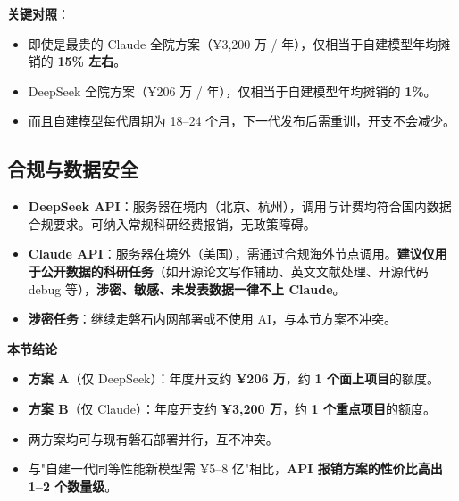 \textbf{关键对照}：
\begin{itemize}
\item 即使是最贵的 Claude 全院方案（¥3,200 万 / 年），仅相当于自建模型年均摊销的 \textbf{15\% 左右}。
\item DeepSeek 全院方案（¥206 万 / 年），仅相当于自建模型年均摊销的 \textbf{1\%}。
\item 而且自建模型每代周期为 18--24 个月，下一代发布后需重训，开支不会减少。
\end{itemize}

\subsection{合规与数据安全}

\begin{itemize}
\item \textbf{DeepSeek API}：服务器在境内（北京、杭州），调用与计费均符合国内数据合规要求。可纳入常规科研经费报销，无政策障碍。
\item \textbf{Claude API}：服务器在境外（美国），需通过合规海外节点调用。\textbf{建议仅用于公开数据的科研任务}（如开源论文写作辅助、英文文献处理、开源代码 debug 等），\textbf{涉密、敏感、未发表数据一律不上 Claude}。
\item \textbf{涉密任务}：继续走磐石内网部署或不使用 AI，与本节方案不冲突。
\end{itemize}

\begin{keypoint}
\sffamily\textbf{本节结论}\\[3pt]
\normalfont
\begin{itemize}[leftmargin=18pt,topsep=2pt]
\item \textbf{方案 A}（仅 DeepSeek）：年度开支约 \textbf{¥206 万}，约 \textbf{1 个面上项目}的额度。
\item \textbf{方案 B}（仅 Claude）：年度开支约 \textbf{¥3,200 万}，约 \textbf{1 个重点项目}的额度。
\item 两方案均可与现有磐石部署并行，互不冲突。
\item 与"自建一代同等性能新模型需 ¥5--8 亿"相比，\textbf{API 报销方案的性价比高出 1--2 个数量级}。
\end{itemize}
\end{keypoint}
